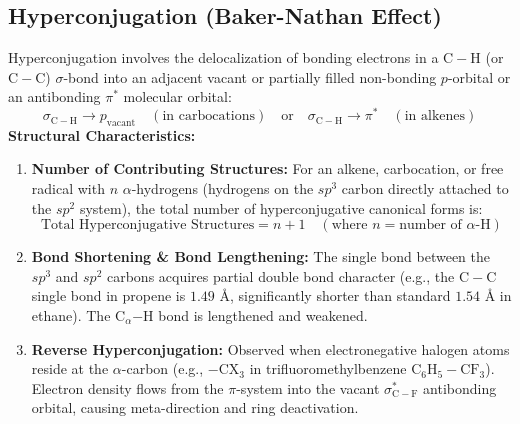 \documentclass[10pt,a4paper]{article}
\begin{document}
\subsection{Hyperconjugation (Baker-Nathan Effect)}

\begin{conceptbox}
Hyperconjugation involves the delocalization of bonding electrons in a $\mathrm{C-H}$ (or $\mathrm{C-C}$) $\sigma$-bond into an adjacent vacant or partially filled non-bonding $p$-orbital or an antibonding $\pi^*$ molecular orbital:
\begin{equation}
  \sigma_{\mathrm{C-H}} \longrightarrow p_{\text{vacant}} \quad (\text{in carbocations}) \quad \text{or} \quad \sigma_{\mathrm{C-H}} \longrightarrow \pi^* \quad (\text{in alkenes})
\end{equation}
\textbf{Structural Characteristics:}
\begin{enumerate}[leftmargin=*]
  \item \textbf{Number of Contributing Structures:} For an alkene, carbocation, or free radical with $n$ $\alpha$-hydrogens (hydrogens on the $sp^3$ carbon directly attached to the $sp^2$ system), the total number of hyperconjugative canonical forms is:
  \begin{equation}
    \text{Total Hyperconjugative Structures} = n + 1 \quad (\text{where } n = \text{number of } \alpha\text{-H})
  \end{equation}
  \item \textbf{Bond Shortening \& Bond Lengthening:} The single bond between the $sp^3$ and $sp^2$ carbons acquires partial double bond character (e.g., the $\mathrm{C-C}$ single bond in propene is $1.49\text{ \AA}$, significantly shorter than standard $1.54\text{ \AA}$ in ethane). The $\mathrm{C}_\alpha\mathrm{-H}$ bond is lengthened and weakened.
  \item \textbf{Reverse Hyperconjugation:} Observed when electronegative halogen atoms reside at the $\alpha$-carbon (e.g., $-\mathrm{CX_3}$ in trifluoromethylbenzene $\mathrm{C_6H_5-CF_3}$). Electron density flows from the $\pi$-system into the vacant $\sigma^*_{\mathrm{C-F}}$ antibonding orbital, causing meta-direction and ring deactivation.
\end{enumerate}
\end{conceptbox}
\end{document}
